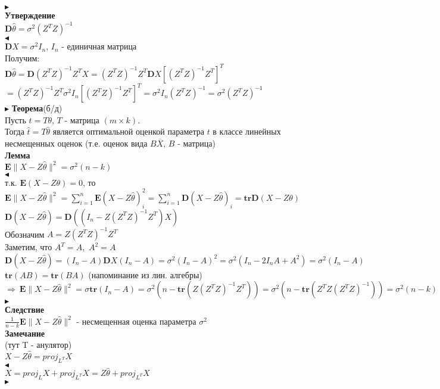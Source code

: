 \documentclass{article}
\begin{document}
$\blacktriangleright$\\
\textbf{Утверждение}\\
$\mathbf{D}\widehat{\theta} = \sigma^2(Z^TZ)^{-1}$\\
$\blacktriangleleft$\\
$\mathbf{D}X = \sigma^2I_n$, $I_n$ - единичная матрица\\
Получим:\\
$\mathbf{D}\widehat{\theta} = \mathbf{D}(Z^TZ)^{-1}Z^TX = (Z^TZ)^{-1}Z^T\mathbf{D}X[(Z^TZ)^{-1}Z^T]^T$\\ $= (Z^TZ)^{-1}Z^T\sigma^2I_n[(Z^TZ)^{-1}Z^T]^T = \sigma^2I_n(Z^TZ)^{-1} = \sigma^2(Z^TZ)^{-1}$\\
$\blacktriangleright$
\textbf{Теорема}(б/д)\\
Пусть $t = T\theta$, $T$ - матрица $(m\times k)$.\\
Тогда $\widehat{t} = T\widehat{\theta}$ является оптимальной оценкой параметра $t$ в классе линейных
несмещенных оценок (т.е. оценок вида $B\overline{X}$, $B$ - матрица)\\
\textbf{Лемма}\\
$\mathbf{E}\|X - Z\widehat{\theta}\|^2 = \sigma^2(n - k)$\\
$\blacktriangleleft$\\
т.к. $\mathbf{E}(X - Z\theta) = 0$, то\\
$\mathbf{E}\|X - Z\widehat{\theta}\|^2 = \sum_{i=1}^n{\mathbf{E}(X - Z\widehat{\theta})^2_i} = 
\sum_{i=1}^n{\mathbf{D}(X - Z\widehat{\theta})_i} = \mathbf{tr}\mathbf{D}(X - Z\theta)$\\
$\mathbf{D}(X - Z\widehat{\theta}) = \mathbf{D}((I_n - Z(Z^TZ)^{-1}Z^T)X)$\\
Обозначим $A = Z(Z^TZ)^{-1}Z^T$\\
Заметим, что $A^T = A$,\ $A^2 = A$\\
$\mathbf{D}(X - Z\widehat{\theta}) = (I_n - A)\mathbf{D}X(I_n - A) = \sigma^2(I_n - A)^2 = 
\sigma^2(I_n - 2I_nA + A^2) = \sigma^2(I_n - A)$\\
$\mathbf{tr}(AB) = \mathbf{tr}(BA)$ (напоминание из лин. алгебры)\\
$\Rightarrow\ \mathbf{E}\|X-Z\widehat{\theta}\|^2 = \sigma\mathbf{tr}(I_n - A) =
\sigma^2(n - \mathbf{tr}(Z(Z^TZ)^{-1}Z^T)) = \sigma^2(n - \mathbf{tr}(Z^TZ(Z^TZ)^{-1})) =
\sigma^2(n - k)$\\
$\blacktriangleright$\\
\textbf{Следствие}\\
$\frac{1}{n - k}\mathbf{E}\|X-Z\widehat{\theta}\|^2$ - несмещенная оценка параметра $\sigma^2$\\
\textbf{Замечание}\\
(тут T - анулятор)\\
$X - Z\widehat{\theta} = proj_{L^T}X$\\
$\blacktriangleleft$\\
$X = proj_LX + proj_{L^T}X = Z\widehat{\theta} + proj_{L^T}X$\\
$\blacktriangleright$\\
\end{document}
